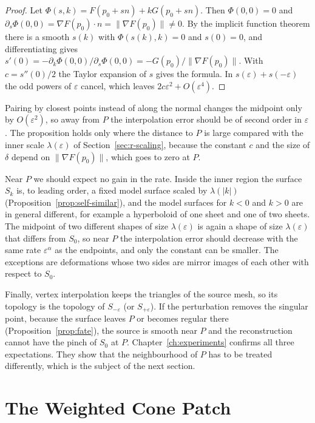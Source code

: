 \documentclass[12pt, a4paper, oneside]{book}
\theoremstyle{plain}
\theoremstyle{definition}
\theoremstyle{remark}
\theoremstyle{definition}
\begin{document}
\begin{proof}
Let $\Phi(s,k)=F(p_0+sn)+kG(p_0+sn)$. Then $\Phi(0,0)=0$ and $\partial_s\Phi(0,0)=\nabla F(p_0)\cdot n=\|\nabla F(p_0)\|\neq0$. By the implicit function theorem there is a smooth $s(k)$ with $\Phi(s(k),k)=0$ and $s(0)=0$, and differentiating gives $s'(0)=-\partial_k\Phi(0,0)/\partial_s\Phi(0,0)=-G(p_0)/\|\nabla F(p_0)\|$. With $c=s''(0)/2$ the Taylor expansion of $s$ gives the formula. In $s(\varepsilon)+s(-\varepsilon)$ the odd powers of $\varepsilon$ cancel, which leaves $2c\varepsilon^2+O(\varepsilon^4)$.
\end{proof}

Pairing by closest points instead of along the normal changes the midpoint only by $O(\varepsilon^2)$, so away from $P$ the interpolation error should be of second order in $\varepsilon$. The proposition holds only where the distance to $P$ is large compared with the inner scale $\lambda(\varepsilon)$ of Section~\ref{sec:r-scaling}, because the constant $c$ and the size of $\delta$ depend on $\|\nabla F(p_0)\|$, which goes to zero at $P$.

Near $P$ we should expect no gain in the rate. Inside the inner region the surface $S_k$ is, to leading order, a fixed model surface scaled by $\lambda(|k|)$ (Proposition~\ref{prop:self-similar}), and the model surfaces for $k<0$ and $k>0$ are in general different, for example a hyperboloid of one sheet and one of two sheets. The midpoint of two different shapes of size $\lambda(\varepsilon)$ is again a shape of size $\lambda(\varepsilon)$ that differs from $S_0$, so near $P$ the interpolation error should decrease with the same rate $\varepsilon^\alpha$ as the endpoints, and only the constant can be smaller. The exceptions are deformations whose two sides are mirror images of each other with respect to $S_0$.

Finally, vertex interpolation keeps the triangles of the source mesh, so its topology is the topology of $S_{-\varepsilon}$ (or $S_{+\varepsilon}$). If the perturbation removes the singular point, because the surface leaves $P$ or becomes regular there (Proposition~\ref{prop:fate}), the source is smooth near $P$ and the reconstruction cannot have the pinch of $S_0$ at $P$. Chapter~\ref{ch:experiments} confirms all three expectations. They show that the neighbourhood of $P$ has to be treated differently, which is the subject of the next section.

\section{The Weighted Cone Patch}
\label{sec:r-cone}
\end{document}
